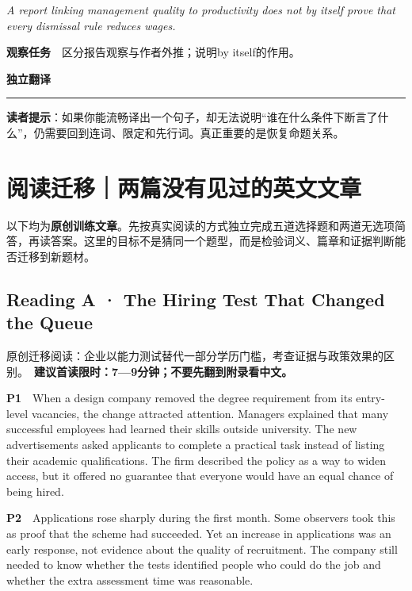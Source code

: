 \documentclass[
  11pt,
]{ctexart}
\renewenvironment{quote}{\begin{tcolorbox}[enhanced,breakable,colback=sand,colframe=primary!22,boxrule=0.4pt,arc=2pt,left=2.6mm,right=2.6mm,top=1.6mm,bottom=1.6mm]\itshape}{\end{tcolorbox}}
\begin{document}
\begin{quote}
A report linking management quality to productivity does not by itself
prove that every dismissal rule reduces wages.
\end{quote}

\textbf{观察任务}　区分报告观察与作者外推；说明by itself的作用。

\textbf{独立翻译}　

\rule{0.8\linewidth}{0.35pt}

\textbf{读者提示}：如果你能流畅译出一个句子，却无法说明``谁在什么条件下断言了什么''，仍需要回到连词、限定和先行词。真正重要的是恢复命题关系。

\section{阅读迁移｜两篇没有见过的英文文章}\label{ux9605ux8bfbux8fc1ux79fbux4e24ux7bc7ux6ca1ux6709ux89c1ux8fc7ux7684ux82f1ux6587ux6587ux7ae0}

以下均为\textbf{原创训练文章}。先按真实阅读的方式独立完成五道选择题和两道无选项简答，再读答案。这里的目标不是猜同一个题型，而是检验词义、篇章和证据判断能否迁移到新题材。

\subsection{Reading A · The Hiring Test That Changed the
Queue}\label{reading-a-the-hiring-test-that-changed-the-queue}

原创迁移阅读：企业以能力测试替代一部分学历门槛，考查证据与政策效果的区别。　\textbf{建议首读限时：7---9分钟；不要先翻到附录看中文。}

\textbf{P1}　When a design company removed the degree requirement from
its entry-level vacancies, the change attracted attention. Managers
explained that many successful employees had learned their skills
outside university. The new advertisements asked applicants to complete
a practical task instead of listing their academic qualifications. The
firm described the policy as a way to widen access, but it offered no
guarantee that everyone would have an equal chance of being hired.

\textbf{P2}　Applications rose sharply during the first month. Some
observers took this as proof that the scheme had succeeded. Yet an
increase in applications was an early response, not evidence about the
quality of recruitment. The company still needed to know whether the
tests identified people who could do the job and whether the extra
assessment time was reasonable.
\end{document}
